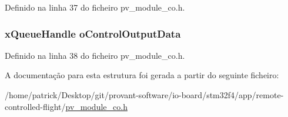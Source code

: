 Definido na linha 37 do ficheiro pv\-\_\-module\-\_\-co.\-h.

\hypertarget{structpv__interface__co_adeb92ab25c31742c709ae51f96cbf10a}{
\subsubsection[{o\-Control\-Output\-Data}]{\setlength{\rightskip}{0pt plus 5cm}x\-Queue\-Handle o\-Control\-Output\-Data}}\label{structpv__interface__co_adeb92ab25c31742c709ae51f96cbf10a}


Definido na linha 38 do ficheiro pv\-\_\-module\-\_\-co.\-h.



A documentação para esta estrutura foi gerada a partir do seguinte ficheiro\-:\begin{DoxyCompactItemize}
\item 
/home/patrick/\-Desktop/git/provant-\/software/io-\/board/stm32f4/app/remote-\/controlled-\/flight/\hyperlink{pv__module__co_8h}{pv\-\_\-module\-\_\-co.\-h}\end{DoxyCompactItemize}
